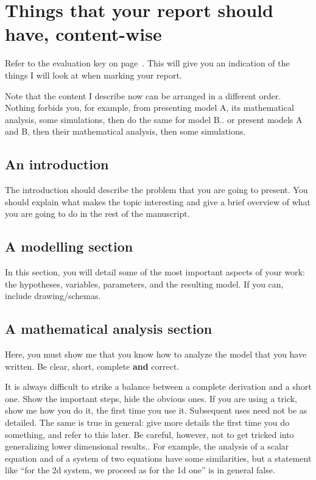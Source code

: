 \documentclass[12pt]{article}
\begin{document}
\section{Things that your report should have, content-wise}
Refer to the evaluation key on page~\pageref{sec:eval_key}. This will give you an indication of the things I will look at when marking your report. 

Note that the content I describe now can be arranged in a different order. Nothing forbids you, for example, from presenting model A, its mathematical analysis, some simulations, then do the same for model B.. or present models A and B, then their mathematical analysis, then some simulations.

\subsection{An introduction}
The introduction should describe the problem that you are going to present. You should explain what makes the topic interesting and give a brief overview of what you are going to do in the rest of the manuscript.

\subsection{A modelling section}
In this section, you will detail some of the most important aspects of your work: the hypotheses, variables, parameters, and the resulting model. If you can, include drawing/schemas.

\subsection{A mathematical analysis section}
Here, you must show me that you know how to analyze the model that you have written. Be clear, short, complete {\bf and} correct. 

It is always difficult to strike a balance between a complete derivation and a short one. Show the important steps, hide the obvious ones. If you are using a trick, show me how you do it, the first time you use it. Subsequent uses need not be as detailed. The same is true in general: give more details the first time you do something, and refer to this later. Be careful, however, not to get tricked into generalizing lower dimensional results.. For example, the analysis of a scalar equation and of a system of two equations have some similarities, but a statement like ``for the 2d system, we proceed as for the 1d one'' is in general false.
\end{document}
